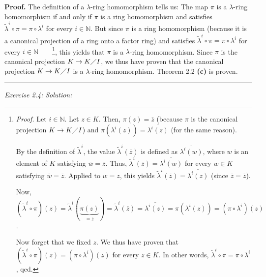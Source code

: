 \documentclass[numbers=enddot,12pt,final,onecolumn,notitlepage]{scrartcl}%
\newenvironment{proof}[1][Proof]{\noindent\textbf{#1.} }{\ \rule{0.5em}{0.5em}}
\begin{document}
\begin{proof}
The definition of a $\lambda$-ring homomorphism tells us: The map $\pi$ is a
$\lambda$-ring homomorphism if and only if $\pi$ is a ring homomorphism and
satisfies $\widetilde{\lambda}^{i}\circ\pi=\pi\circ\lambda^{i}$ for every
$i\in\mathbb{N}$. But since $\pi$ is a ring homomorphism (because it is a
canonical projection of a ring onto a factor ring) and satisfies
$\widetilde{\lambda}^{i}\circ\pi=\pi\circ\lambda^{i}$ for every $i\in
\mathbb{N}$\ \ \ \ \footnote{\textit{Proof.} Let $i\in\mathbb{N}$. Let $z\in
K$. Then, $\pi\left(  z\right)  =\overline{z}$ (because $\pi$ is the canonical
projection $K\rightarrow K\diagup I$) and $\pi\left(  \lambda^{i}\left(
z\right)  \right)  =\overline{\lambda^{i}\left(  z\right)  }$ (for the same
reason).
\par
By the definition of $\widetilde{\lambda}^{i}$, the value $\widetilde{\lambda
}^{i}\left(  \overline{z}\right)  $ is defined as $\overline{\lambda
^{i}\left(  w\right)  }$, where $w$ is an element of $K$ satisfying
$\overline{w}=\overline{z}$. Thus, $\widetilde{\lambda}^{i}\left(
\overline{z}\right)  =\overline{\lambda^{i}\left(  w\right)  }$ for every
$w\in K$ satisfying $\overline{w}=\overline{z}$. Applied to $w=z$, this yields
$\widetilde{\lambda}^{i}\left(  \overline{z}\right)  =\overline{\lambda
^{i}\left(  z\right)  }$ (since $\overline{z}=\overline{z}$).
\par
Now, $\left(  \widetilde{\lambda}^{i}\circ\pi\right)  \left(  z\right)
=\widetilde{\lambda}^{i}\left(  \underbrace{\pi\left(  z\right)  }%
_{=\overline{z}}\right)  =\widetilde{\lambda}^{i}\left(  \overline{z}\right)
=\overline{\lambda^{i}\left(  z\right)  }=\pi\left(  \lambda^{i}\left(
z\right)  \right)  =\left(  \pi\circ\lambda^{i}\right)  \left(  z\right)  $.
\par
Now forget that we fixed $z$. We thus have proven that $\left(
\widetilde{\lambda}^{i}\circ\pi\right)  \left(  z\right)  =\left(  \pi
\circ\lambda^{i}\right)  \left(  z\right)  $ for every $z\in K$. In other
words, $\widetilde{\lambda}^{i}\circ\pi=\pi\circ\lambda^{i}$, qed.}, this
yields that $\pi$ is a $\lambda$-ring homomorphism. Since $\pi$ is the
canonical projection $K\rightarrow K\diagup I$, we thus have proven that the
canonical projection $K\rightarrow K\diagup I$ is a $\lambda$-ring
homomorphism. Theorem 2.2 \textbf{(c)} is proven.
\end{proof}

\textit{Exercise 2.4:} \textit{Solution:}
\end{document}
